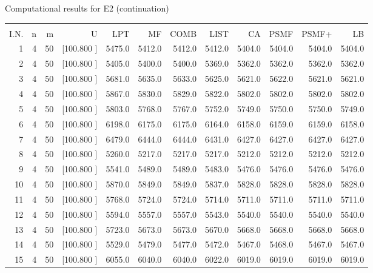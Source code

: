 \documentclass[12pt,a4paper]{article}
\begin{document}
\begin{center}
 Computational results for E2 (continuation) {\tiny
\begin{tabular}{r r r r r r r r r r r r}\hline
    &   &   &          &        &        &        &        &        &        &        &       \\[-0.1in]
  I.N.  &  n  &  m  &  U  &  LPT  &  MF  &  COMB  &  LIST  &  CA  & PSMF &PSMF+ & LB \\[0.03in]
\hline
   1&  4& 50&[100.800   ]&  5475.0&  5412.0&  5412.0&  5412.0&  5404.0&  5404.0&  5404.0&  5404.0\\[-0.02in]
   2&  4& 50&[100.800   ]&  5405.0&  5400.0&  5400.0&  5369.0&  5362.0&  5362.0&  5362.0&  5362.0\\[-0.02in]
   3&  4& 50&[100.800   ]&  5681.0&  5635.0&  5633.0&  5625.0&  5621.0&  5622.0&  5621.0&  5621.0\\[-0.02in]
   4&  4& 50&[100.800   ]&  5867.0&  5830.0&  5829.0&  5822.0&  5802.0&  5802.0&  5802.0&  5802.0\\[-0.02in]
   5&  4& 50&[100.800   ]&  5803.0&  5768.0&  5767.0&  5752.0&  5749.0&  5750.0&  5750.0&  5749.0\\[-0.02in]
   6&  4& 50&[100.800   ]&  6198.0&  6175.0&  6175.0&  6164.0&  6158.0&  6159.0&  6159.0&  6158.0\\[-0.02in]
   7&  4& 50&[100.800   ]&  6479.0&  6444.0&  6444.0&  6431.0&  6427.0&  6427.0&  6427.0&  6427.0\\[-0.02in]
   8&  4& 50&[100.800   ]&  5260.0&  5217.0&  5217.0&  5217.0&  5212.0&  5212.0&  5212.0&  5212.0\\[-0.02in]
   9&  4& 50&[100.800   ]&  5541.0&  5489.0&  5489.0&  5483.0&  5476.0&  5476.0&  5476.0&  5476.0\\[-0.02in]
  10&  4& 50&[100.800   ]&  5870.0&  5849.0&  5849.0&  5837.0&  5828.0&  5828.0&  5828.0&  5828.0\\[-0.02in]
  11&  4& 50&[100.800   ]&  5768.0&  5724.0&  5724.0&  5714.0&  5711.0&  5711.0&  5711.0&  5711.0\\[-0.02in]
  12&  4& 50&[100.800   ]&  5594.0&  5557.0&  5557.0&  5543.0&  5540.0&  5540.0&  5540.0&  5540.0\\[-0.02in]
  13&  4& 50&[100.800   ]&  5723.0&  5673.0&  5673.0&  5670.0&  5668.0&  5668.0&  5668.0&  5668.0\\[-0.02in]
  14&  4& 50&[100.800   ]&  5529.0&  5479.0&  5477.0&  5472.0&  5467.0&  5468.0&  5467.0&  5467.0\\[-0.02in]
  15&  4& 50&[100.800   ]&  6055.0&  6040.0&  6040.0&  6022.0&  6019.0&  6019.0&  6019.0&  6019.0\\[-0.02in]

\end{tabular}}
\end{center}
\end{document}
